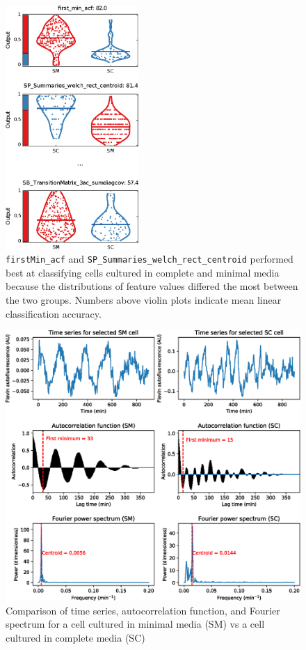 \begin{figure}[htbp]
  \centering
  \includegraphics[width=0.45\textwidth]{10m_EffectofMediaTopFeatures}
  \caption{\texttt{first\-Min\_\-acf} and \texttt{SP\_\-Summaries\_\-welch\_\-rect\_\-centroid} performed best at classifying cells cultured in complete and minimal media because the distributions of feature values differed the most between the two groups.
    Numbers above violin plots indicate mean linear classification accuracy.}
  \label{fig:EffectofMediaTopFeatures}
\end{figure}

\begin{figure}[htbp]
  \centering
  \includegraphics[width=\textwidth]{10m_catch22validation}
  \caption{Comparison of time series, autocorrelation function, and Fourier spectrum for a cell cultured in minimal media (SM) vs a cell cultured in complete media (SC)}
  \label{fig:catch22validation}
\end{figure}

